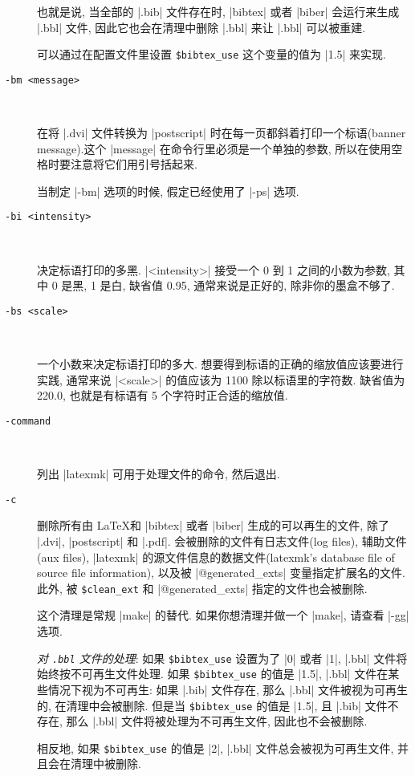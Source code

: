 \documentclass{ctexart}
\begin{document}
\begin{description}
		也就是说, 当全部的 |.bib| 文件存在时, |bibtex| 或者 |biber| 会运行来生成 |.bbl| 文件, 因此它也会在清理中删除 |.bbl| 来让 |.bbl| 可以被重建.

		可以通过在配置文件里设置 \verb|$bibtex_use| 这个变量的值为 |1.5| 来实现.

		\item[\texttt{-bm <message>}]~
		
		在将 |.dvi| 文件转换为 |postscript| 时在每一页都斜着打印一个标语(banner message).这个 |message| 在命令行里必须是一个单独的参数, 所以在使用空格时要注意将它们用引号括起来.

		当制定 |-bm| 选项的时候, 假定已经使用了 |-ps| 选项.

		\item[\texttt{-bi <intensity>}]~
		
		决定标语打印的多黑. |<intensity>| 接受一个 0 到 1 之间的小数为参数, 其中 0 是黑, 1 是白, 缺省值 0.95, 通常来说是正好的, 除非你的墨盒不够了.

		\item[\texttt{-bs <scale>}]~
		
		一个小数来决定标语打印的多大. 想要得到标语的正确的缩放值应该要进行实践, 通常来说 |<scale>| 的值应该为 1100 除以标语里的字符数. 缺省值为 220.0, 也就是有标语有 5 个字符时正合适的缩放值.

		\item[\texttt{-command}]~
		
		列出 |latexmk| 可用于处理文件的命令, 然后退出.

		\item[\texttt{-c}] 删除所有由 \LaTeX 和 |bibtex| 或者 |biber| 生成的可以再生的文件, 除了 |.dvi|, |postscript| 和 |.pdf|. 会被删除的文件有日志文件(log files), 辅助文件(aux files), |latexmk| 的源文件信息的数据文件(latexmk's database file of source file information), 以及被 |@generated_exts| 变量指定扩展名的文件. 此外, 被 \verb|$clean_ext| 和 |@generated_exts| 指定的文件也会被删除.
		
		这个清理是常规 |make| 的替代. 如果你想清理并做一个 |make|, 请查看 |-gg| 选项.

		\emph{对 \texttt{.bbl} 文件的处理}: 如果 \verb|$bibtex_use| 设置为了 |0| 或者 |1|, |.bbl| 文件将始终按不可再生文件处理. 如果 \verb|$bibtex_use| 的值是 |1.5|, |.bbl| 文件在某些情况下视为不可再生: 如果 |.bib| 文件存在, 那么 |.bbl| 文件被视为可再生的, 在清理中会被删除. 但是当 \verb|$bibtex_use| 的值是 |1.5|, 且 |.bib| 文件不存在, 那么 |.bbl| 文件将被处理为不可再生文件, 因此也不会被删除.

		相反地, 如果 \verb|$bibtex_use| 的值是 |2|, |.bbl| 文件总会被视为可再生文件, 并且会在清理中被删除.


\end{description}
\end{document}
